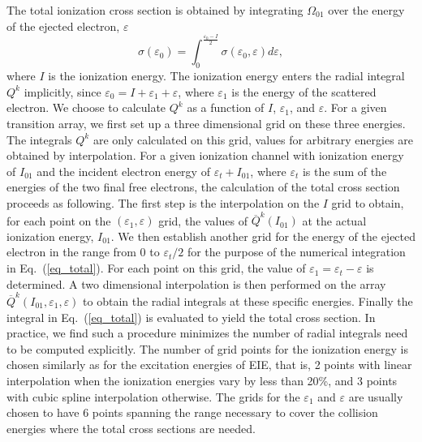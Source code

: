 \documentclass[preprint, floatfix, pra, showpacs, showkeys]{revtex4}
\begin{document}
The total ionization cross section is obtained by integrating $\Omega_{01}$
over the energy of the ejected electron, $\varepsilon$
\begin{equation}
\label{eq_total}
\sigma(\varepsilon_0) = \int\nolimits_0^{\frac{\varepsilon_0-I}{2}}
\sigma(\varepsilon_0,\varepsilon) d\varepsilon,
\end{equation}
where $I$ is the ionization energy. The ionization energy enters the
radial integral $Q^k$ implicitly, since $\varepsilon_0 =
I+\varepsilon_1+\varepsilon$, where $\varepsilon_1$ is the energy of the
scattered electron. We choose to calculate $Q^k$ as a function of $I$,
$\varepsilon_1$, and $\varepsilon$. For a given transition array, we first set
up a three dimensional grid on these three energies. The integrals $Q^k$ are 
only calculated on this grid, values for arbitrary energies are obtained by
interpolation. For a given ionization channel with
ionization energy of $I_{01}$ and the incident electron energy of
$\varepsilon_t + I_{01}$, where $\varepsilon_t$ is the sum of the energies of
the two final free electrons, the calculation of the total cross section
proceeds as 
following. The first step is the interpolation on the $I$ grid to obtain, for
each point on the $(\varepsilon_1,\varepsilon)$ grid, the values of
$\overline{Q}^k(I_{01})$ at the actual ionization energy, $I_{01}$. We then
establish another grid for the energy of the ejected electron in the range 
from 0 to $\varepsilon_t/2$ for the purpose of the numerical integration in
Eq.~(\ref{eq_total}). For each 
point on this grid, the value of $\varepsilon_1 = \varepsilon_t-\varepsilon$
is determined. A two dimensional interpolation is then performed on the array
$\overline{Q}^k(I_{01},\varepsilon_1,\varepsilon)$ to obtain the radial
integrals at these specific 
energies. Finally the integral in Eq.~(\ref{eq_total}) is evaluated to
yield the total cross section. In practice, we find such a procedure
minimizes the number of radial integrals need to be computed explicitly. The
number of grid points for the ionization energy is chosen similarly as for the
excitation energies of EIE, that is, 2 points with linear interpolation when
the ionization energies vary by less than 20\%, and 3 points with cubic spline
interpolation otherwise. The grids for the $\varepsilon_1$ and $\varepsilon$
are usually chosen to have 6 points spanning the range necessary to cover the
collision energies where the total cross sections are needed.
\end{document}
